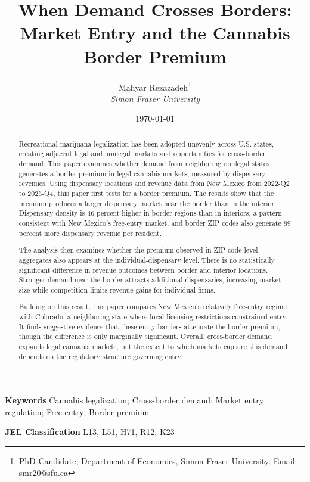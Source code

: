 \documentclass[12pt]{article}
\begin{document}
\title{When Demand Crosses Borders: Market Entry and the Cannabis Border Premium}
\author{Mahyar Rezazadeh\thanks{PhD Candidate, Department of Economics, Simon Fraser University. Email: \href{mailto:smr20@sfu.ca}{smr20@sfu.ca}}\\ {\small \emph{Simon Fraser University}}}
\date{\today}
\maketitle
\thispagestyle{empty}
\begin{abstract}
\noindent Recreational marijuana legalization has been adopted unevenly across U.S. states, creating adjacent legal and nonlegal markets and opportunities for cross-border demand. This paper examines whether demand from neighboring nonlegal states generates a border premium in legal cannabis markets, measured by dispensary revenues. Using dispensary locations and revenue data from New Mexico from 2022-Q2 to 2025-Q4, this paper first tests for a border premium. The results show that the premium produces a larger dispensary market near the border than in the interior. Dispensary density is 46 percent higher in border regions than in interiors, a pattern consistent with New Mexico's free-entry market, and border ZIP codes also generate 89 percent more dispensary revenue per resident.

The analysis then examines whether the premium observed in ZIP-code-level aggregates also appears at the individual-dispensary level. There is no statistically significant difference in revenue outcomes between border and interior locations. Stronger demand near the border attracts additional dispensaries, increasing market size while competition limits revenue gains for individual firms.

Building on this result, this paper compares New Mexico's relatively free-entry regime with Colorado, a neighboring state where local licensing restrictions constrained entry. It finds suggestive evidence that these entry barriers attenuate the border premium, though the difference is only marginally significant. Overall, cross-border demand expands legal cannabis markets, but the extent to which markets capture this demand depends on the regulatory structure governing entry.
\end{abstract}

\medskip
\noindent \textbf{Keywords} Cannabis legalization; Cross-border demand; Market entry regulation; Free entry; Border premium

\smallskip
\noindent \textbf{JEL Classification} L13, L51, H71, R12, K23
\newpage
\end{document}
